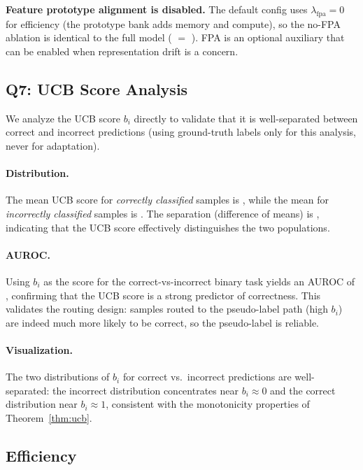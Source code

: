 \textbf{Feature prototype alignment is disabled.} The default config uses $\lambda_\mathrm{fpa}=0$ for efficiency (the prototype bank adds memory and compute), so the no-FPA ablation is identical to the full model (\ablationfull{} $=$ \ablationnofpa{}). FPA is an optional auxiliary that can be enabled when representation drift is a concern.

\subsection{Q7: UCB Score Analysis}
\label{sec:exp:ucb-analysis}

We analyze the UCB score $b_i$ directly to validate that it is well-separated between correct and incorrect predictions (using ground-truth labels only for this analysis, never for adaptation).

\paragraph{Distribution.}
The mean UCB score for \emph{correctly classified} samples is \ucbmeancertain{}, while the mean for \emph{incorrectly classified} samples is \ucbmeanuncertain{}. The separation (difference of means) is \ucbseparation{}, indicating that the UCB score effectively distinguishes the two populations.

\paragraph{AUROC.}
Using $b_i$ as the score for the correct-vs-incorrect binary task yields an AUROC of \ucbauroc{}, confirming that the UCB score is a strong predictor of correctness. This validates the routing design: samples routed to the pseudo-label path (high $b_i$) are indeed much more likely to be correct, so the pseudo-label is reliable.

\paragraph{Visualization.}
The two distributions of $b_i$ for correct vs.\ incorrect predictions are well-separated: the incorrect distribution concentrates near $b_i \approx 0$ and the correct distribution near $b_i \approx 1$, consistent with the monotonicity properties of Theorem~\ref{thm:ucb}.

\subsection{Efficiency}
\label{sec:exp:efficiency}

